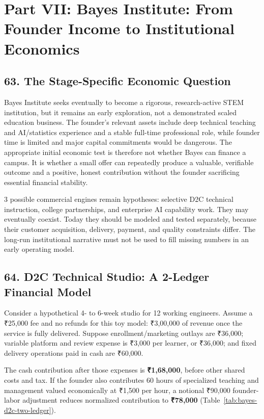 \section*{Part VII: Bayes Institute: From Founder Income to Institutional Economics}

\subsection*{63. The Stage-Specific Economic Question}

Bayes Institute seeks eventually to become a rigorous, research-active STEM institution, but it remains an early exploration, not a demonstrated scaled education business. The founder's relevant assets include deep technical teaching and AI/statistics experience and a stable full-time professional role, while founder time is limited and major capital commitments would be dangerous. The appropriate initial economic test is therefore not whether Bayes can finance a campus. It is whether a small offer can repeatedly produce a valuable, verifiable outcome and a positive, honest contribution without the founder sacrificing essential financial stability.

3 possible commercial engines remain hypotheses: selective D2C technical instruction, college partnerships, and enterprise AI capability work. They may eventually coexist. Today they should be modeled and tested separately, because their customer acquisition, delivery, payment, and quality constraints differ. The long-run institutional narrative must not be used to fill missing numbers in an early operating model.

\subsection*{64. D2C Technical Studio: A 2-Ledger Financial Model}

Consider a hypothetical 4- to 6-week studio for 12 working engineers. Assume a ₹25,000 fee and no refunds for this toy model: ₹3,00,000 of revenue once the service is fully delivered. Suppose enrollment/marketing outlays are ₹36,000; variable platform and review expense is ₹3,000 per learner, or ₹36,000; and fixed delivery operations paid in cash are ₹60,000.

The cash contribution after those expenses is \textbf{₹1,68,000}, before other shared costs and tax. If the founder also contributes 60 hours of specialized teaching and management valued economically at ₹1,500 per hour, a notional ₹90,000 founder-labor adjustment reduces normalized contribution to \textbf{₹78,000} (Table~\ref{tab:bayes-d2c-two-ledger}).

